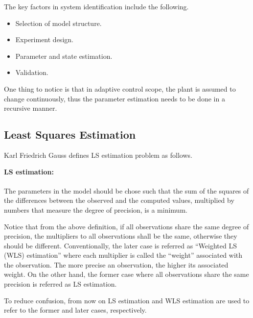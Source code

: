 The key factors in system identification include the following.
\begin{itemize}
	\item Selection of model structure.
	\item Experiment design.
	\item Parameter and state estimation.
	\item Validation.
\end{itemize}

One thing to notice is that in adaptive control scope, the plant is assumed to change continuously, thus the parameter estimation needs to be done in a recursive manner.

\subsection{Least Squares Estimation}

Karl Friedrich Gauss defines LS estimation problem as follows.

\begin{VF}
\textbf{LS estimation:}
\\
\\
\noindent The parameters in the model should be chose such that the sum of the squares of the differences between the observed and the computed values, multiplied by numbers that measure the degree of precision, is a minimum.
\end{VF}

Notice that from the above definition, if all observations share the same degree of precision, the multipliers to all observations shall be the same, otherwise they should be different. Conventionally, the later case is referred as ``Weighted LS (WLS) estimation'' where each multiplier is called the ``weight'' associated with the observation. The more precise an observation, the higher its associated weight. On the other hand, the former case where all observations share the same precision is referred as LS estimation.

To reduce confusion, from now on LS estimation and WLS estimation are used to refer to the former and later cases, respectively.

